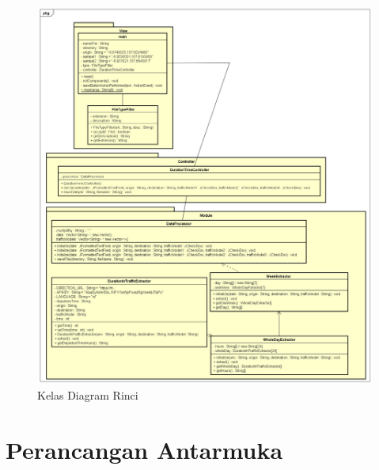 \begin{figure}[H]
				\centering		
				\includegraphics[scale=0.35]{Gambar/classdiagramlengkap.png}
				\caption[Kelas Diagram Rinci]{Kelas Diagram Rinci}
				\label{fig:kelasdiagramrinci}	
			\end{figure}
			
\section{Perancangan Antarmuka}
\label{sec:perancanganantarmuka}

